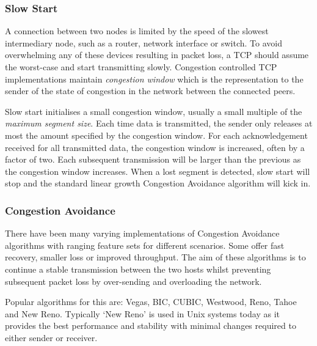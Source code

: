 
        \subsubsection{Slow Start}
            A connection between two nodes is limited by the speed of the slowest intermediary node, such as a router, network interface or switch. To avoid overwhelming any of these devices resulting in packet loss, a \gls{TCP} should assume the worst-case and start transmitting slowly. Congestion controlled \gls{TCP} implementations maintain \textit{congestion window} which is the representation to the sender of the state of congestion in the network between the connected peers.

            Slow start initialises a small congestion window, usually a small multiple of the \textit{maximum segment size}. Each time data is transmitted, the sender only releases at most the amount specified by the congestion window. For each acknowledgement received for all transmitted data, the congestion window is increased, often by a factor of two. Each subsequent transmission will be larger than the previous as the congestion window increases. When a lost segment is detected, slow start will stop and the standard linear growth Congestion Avoidance algorithm will kick in.

        \subsubsection{Congestion Avoidance}
            There have been many varying implementations of Congestion Avoidance algorithms with ranging feature sets for different scenarios. Some offer fast recovery, smaller loss or improved throughput. The aim of these algorithms is to continue a stable transmission between the two hosts whilst preventing subsequent packet loss by over-sending and overloading the network.

            Popular algorithms for this are: Vegas, BIC, CUBIC, Westwood, Reno, Tahoe and New Reno. Typically `New Reno' is used in Unix systems today as it provides the best performance and stability with minimal changes required to either sender or receiver.
